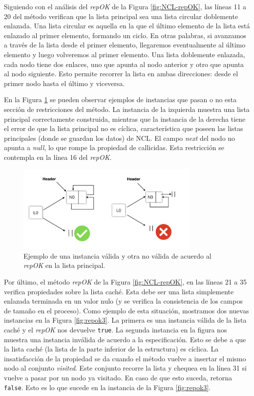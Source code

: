 Siguiendo con el análisis del \emph{repOK} de la Figura \ref{fig:NCL-repOK}, las líneas 11 a 20 del método verifican que la lista principal 
sea una lista circular doblemente enlazada. Una lista circular es aquella en la que el último elemento de la lista está enlazado al primer elemento, formando un ciclo. 
En otras palabras, si avanzamos a través de la lista desde el primer elemento, llegaremos eventualmente al último elemento y luego volveremos al primer elemento.
Una lista doblemente enlazada, cada nodo tiene dos enlaces, uno que apunta al nodo anterior y otro que apunta al nodo siguiente. 
Esto permite recorrer la lista en ambas direcciones: desde el primer nodo hasta el último y viceversa.

En la Figura \ref{fig:repok2} se pueden observar ejemplos de instancias que pasan o no esta sección de restricciones del método. 
La instancia de la izquierda muestra una lista principal correctamente construida, mientras que la instancia de la derecha tiene el error de que la lista principal no es cíclica, 
característica que poseen las listas principales (donde se guardan los datos) de NCL. 
El campo \emph{next} del nodo no apunta a \emph{null}, lo que rompe la propiedad de callicidas. 
Esta restricción se contempla en la línea 16 del \emph{repOK}.

\begin{figure}[H]
  \centering
  \includegraphics[width=0.8\textwidth]{images/repok2.jpg}
  \caption{Ejemplo de una instancia válida y otra no válida de acuerdo al \emph{repOK} en la lista principal.}
  \label{fig:repok2}
\end{figure}

Por último, el método \emph{repOK} de la Figura \ref{fig:NCL-repOK}, en las líneas 21 a 35 verifica propiedades sobre la lista caché. 
Esta debe ser una lista simplemente enlazada terminada en un valor nulo (y se verifica la consistencia de los campos de tamaño en el proceso). 
Como ejemplo de esta situación, mostramos dos nuevas instancias en la Figura \ref{fig:repok3}. 
La primera es una instancia válida de la lista caché y el \emph{repOK} nos devuelve \texttt{true}. 
La segunda instancia en la figura nos muestra una instancia inválida de acuerdo a la especificación. 
Esto se debe a que la lista caché (la lista de la parte inferior de la estructura) es cíclica. 
La insatisfacción de la propiedad se da cuando el método vuelve a insertar el mismo nodo al conjunto \emph{visited}. 
Este conjunto recorre la lista y chequea en la línea 31 si vuelve a pasar por un nodo ya visitado. 
En caso de que esto suceda, retorna \texttt{false}. Esto es lo que sucede en la instancia de la Figura \ref{fig:repok3}.

